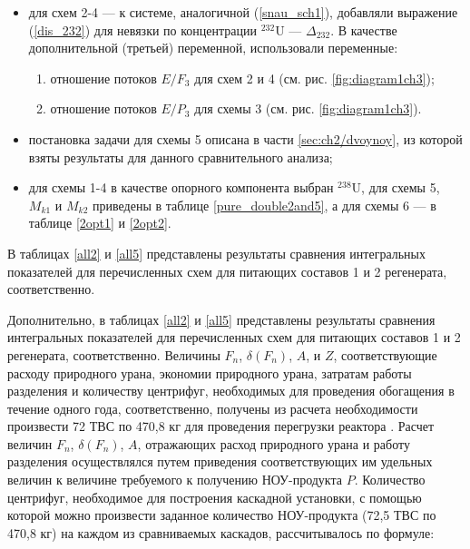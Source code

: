 \begin{itemize}
    \item для схем 2-4 --- к системе, аналогичной (\ref{snau_sch1}), добавляли выражение (\ref{dis_232}) для невязки по концентрации $^{232}$U --- $\Delta_{232}$. В качестве дополнительной (третьей) переменной, использовали переменные:
    \begin{enumerate}
        \item отношение потоков $E/{F_3}$ для схем 2 и 4 (см. рис. \ref{fig:diagram1ch3});
        \item отношение потоков $E/{P_3}$ для схемы 3 (см. рис. \ref{fig:diagram1ch3}).
    \end{enumerate}
    \item постановка задачи для схемы 5 описана в части \ref{sec:ch2/dvoynoy}, из которой взяты результаты для данного сравнительного анализа;
    \item для схемы 1-4 в качестве опорного компонента выбран $^{238}$U, для схемы 5, $M_{k1}$ и $M_{k2}$ приведены в таблице \ref{pure_double2and5}, а для схемы 6 --- в таблице \ref{2opt1} и \ref{2opt2}.
\end{itemize}

В таблицах \ref{all2} и \ref{all5} представлены результаты сравнения интегральных показателей для перечисленных схем для питающих составов 1 и 2 регенерата, соответственно.

Дополнительно, в таблицах \ref{all2} и \ref{all5} представлены результаты сравнения интегральных показателей для перечисленных схем для питающих составов 1 и 2 регенерата, соответственно.
Величины $F_n$, $\delta(F_n)$, $A$, и $Z$, соответствующие расходу природного урана, экономии природного урана, затратам работы разделения и количеству центрифуг, необходимых для проведения обогащения в течение одного года, соответственно, получены из расчета необходимости произвести 72 ТВС по 470,8 кг для проведения перегрузки реактора \cite{BOBROVPovyshenieTehnikoekonomicheskihHarakteristik2019}. Расчет величин $F_n$, $\delta(F_n)$, $A$, отражающих расход природного урана и работу разделения осуществлялся путем приведения соответствующих им удельных величин к величине требуемого к получению НОУ-продукта $P$. Количество центрифуг, необходимое для построения каскадной установки, с помощью которой можно произвести заданное количество НОУ-продукта (72,5 ТВС по 470,8 кг) на каждом из сравниваемых каскадов, рассчитывалось по формуле:

